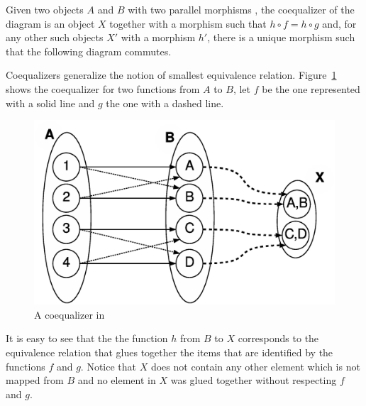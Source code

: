 \begin{definition}[Coequalizer] Given two objects $A$ and $B$ with two parallel morphisms  , the coequalizer of the diagram is an object $X$ together with a morphism  such that \mbox{$h \circ f = h \circ g$} and, for any other such objects $X'$ with a morphism $h'$, there is a unique morphism  such that the following diagram commutes.

\end{definition}

\begin{example} Coequalizers generalize the notion of smallest equivalence relation. Figure~\ref{fig:gts:coequalizer} shows the coequalizer for two functions from $A$ to $B$, let $f$ be the one represented with a solid line and $g$ the one with a dashed line.

\begin{figure}[!ht]
  \centering
  \includegraphics[scale=0.4]{images/gts/coequalizer}
  \caption{A coequalizer in }\label{fig:gts:coequalizer}
\end{figure}

  It is easy to see that the the function $h$ from $B$ to $X$ corresponds to the equivalence relation that glues together the items that are identified by the functions $f$ and $g$. Notice that $X$ does not contain any other element which is not mapped from $B$ and no element in $X$ was glued together without respecting $f$ and $g$.

\end{example}

